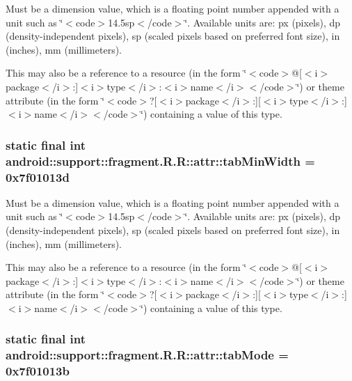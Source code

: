 Must be a dimension value, which is a floating point number appended with a unit such as \char`\"{}$<$code$>$14.5sp$<$/code$>$\char`\"{}. Available units are: px (pixels), dp (density-independent pixels), sp (scaled pixels based on preferred font size), in (inches), mm (millimeters). 

This may also be a reference to a resource (in the form \char`\"{}$<$code$>$@\mbox{[}$<$i$>$package$<$/i$>$:\mbox{]}$<$i$>$type$<$/i$>$:$<$i$>$name$<$/i$>$$<$/code$>$\char`\"{}) or theme attribute (in the form \char`\"{}$<$code$>$?\mbox{[}$<$i$>$package$<$/i$>$:\mbox{]}\mbox{[}$<$i$>$type$<$/i$>$:\mbox{]}$<$i$>$name$<$/i$>$$<$/code$>$\char`\"{}) containing a value of this type. \hypertarget{classandroid_1_1support_1_1fragment_1_1_r_1_1attr_6586a5a69672363a1ef398cafd0fcad7}{
\subsubsection[{tabMinWidth}]{\setlength{\rightskip}{0pt plus 5cm}static final int android::support::fragment.R.R::attr::tabMinWidth = 0x7f01013d}}
\label{classandroid_1_1support_1_1fragment_1_1_r_1_1attr_6586a5a69672363a1ef398cafd0fcad7}


Must be a dimension value, which is a floating point number appended with a unit such as \char`\"{}$<$code$>$14.5sp$<$/code$>$\char`\"{}. Available units are: px (pixels), dp (density-independent pixels), sp (scaled pixels based on preferred font size), in (inches), mm (millimeters). 

This may also be a reference to a resource (in the form \char`\"{}$<$code$>$@\mbox{[}$<$i$>$package$<$/i$>$:\mbox{]}$<$i$>$type$<$/i$>$:$<$i$>$name$<$/i$>$$<$/code$>$\char`\"{}) or theme attribute (in the form \char`\"{}$<$code$>$?\mbox{[}$<$i$>$package$<$/i$>$:\mbox{]}\mbox{[}$<$i$>$type$<$/i$>$:\mbox{]}$<$i$>$name$<$/i$>$$<$/code$>$\char`\"{}) containing a value of this type. \hypertarget{classandroid_1_1support_1_1fragment_1_1_r_1_1attr_59e25052f9730c7cc6561181b6b5229d}{
\subsubsection[{tabMode}]{\setlength{\rightskip}{0pt plus 5cm}static final int android::support::fragment.R.R::attr::tabMode = 0x7f01013b}}
\label{classandroid_1_1support_1_1fragment_1_1_r_1_1attr_59e25052f9730c7cc6561181b6b5229d}


